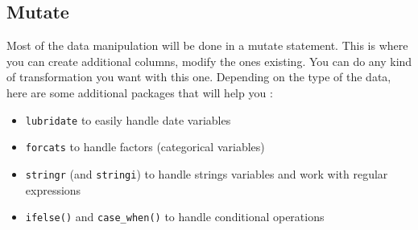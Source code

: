 \documentclass[
]{book}
\newenvironment{Shaded}{\begin{snugshade}}{\end{snugshade}}
\newcommand{\CommentTok}[1]{\textcolor[rgb]{0.56,0.35,0.01}{\textit{#1}}}
\newcommand{\DataTypeTok}[1]{\textcolor[rgb]{0.13,0.29,0.53}{#1}}
\newcommand{\DecValTok}[1]{\textcolor[rgb]{0.00,0.00,0.81}{#1}}
\newcommand{\KeywordTok}[1]{\textcolor[rgb]{0.13,0.29,0.53}{\textbf{#1}}}
\newcommand{\NormalTok}[1]{#1}
\newcommand{\OperatorTok}[1]{\textcolor[rgb]{0.81,0.36,0.00}{\textbf{#1}}}
\newcommand{\OtherTok}[1]{\textcolor[rgb]{0.56,0.35,0.01}{#1}}
\newcommand{\StringTok}[1]{\textcolor[rgb]{0.31,0.60,0.02}{#1}}
\providecommand{\tightlist}{%
  \setlength{\itemsep}{0pt}\setlength{\parskip}{0pt}}
\begin{document}
\hypertarget{mutate}{%
\subsection{Mutate}\label{mutate}}

Most of the data manipulation will be done in a mutate statement. This is where you can create additional columns, modify the ones existing. You can do any kind of transformation you want with this one. Depending on the type of the data, here are some additional packages that will help you :

\begin{itemize}
\tightlist
\item
  \texttt{lubridate} to easily handle date variables
\item
  \texttt{forcats} to handle factors (categorical variables)
\item
  \texttt{stringr} (and \texttt{stringi}) to handle strings variables and work with regular expressions
\item
  \texttt{ifelse()} and \texttt{case\_when()} to handle conditional operations
\end{itemize}

\begin{Shaded}
\end{Shaded}
\end{document}
